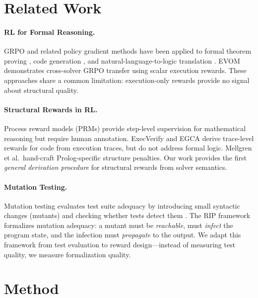 \documentclass[11pt,a4paper]{article}
\begin{document}
\section{Related Work}
\label{sec:related}

\paragraph{RL for Formal Reasoning.}
GRPO and related policy gradient methods have been applied to formal theorem proving \cite{polu2020gpt}, code generation \cite{le2022coderl}, and natural-language-to-logic translation \cite{mellgren2025prolog}. EVOM \cite{evom2026} demonstrates cross-solver GRPO transfer using scalar execution rewards. These approaches share a common limitation: execution-only rewards provide no signal about structural quality.

\paragraph{Structural Rewards in RL.}
Process reward models (PRMs) provide step-level supervision for mathematical reasoning \cite{lightman2023verify} but require human annotation. ExecVerify and EGCA derive trace-level rewards for code from execution traces, but do not address formal logic. Mellgren et al.\ hand-craft Prolog-specific structure penalties. Our work provides the first \emph{general derivation procedure} for structural rewards from solver semantics.

\paragraph{Mutation Testing.}
Mutation testing evaluates test suite adequacy by introducing small syntactic changes (mutants) and checking whether tests detect them \cite{jia2011analysis}. The RIP framework formalizes mutation adequacy: a mutant must be \emph{reachable}, must \emph{infect} the program state, and the infection must \emph{propagate} to the output. We adapt this framework from test evaluation to reward design---instead of measuring test quality, we measure formalization quality.

\section{Method}
\label{sec:method}
\end{document}
